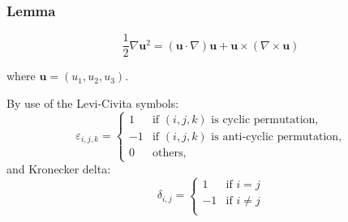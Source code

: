 \subsubsection{Lemma} %


\begin{equation}
\frac{1}{2}\nabla \textbf{u}^2 = \left(\textbf{u}\cdot \nabla\right)\textbf{u} + \textbf{u}\times\left(\nabla\times\textbf{u}\right)
\end{equation}

where $\textbf{u} = (u_1,u_2,u_3)$.


By use of the Levi-Civita symbols:
\begin{equation}
\varepsilon_{i,j,k} =
\begin{cases}
1 & \text{if $(i,j,k)$ is cyclic permutation,}\\
-1 & \text{if $(i,j,k)$ is anti-cyclic permutation,}\\
0 & \text{others,}
\end{cases}
\end{equation}
and Kronecker delta:
\begin{equation}
\delta_{i,j} = \begin{cases}
1 & \text{if $i=j$}\\
-1 & \text{if $i\neq j$}\\
\end{cases}
\end{equation}



